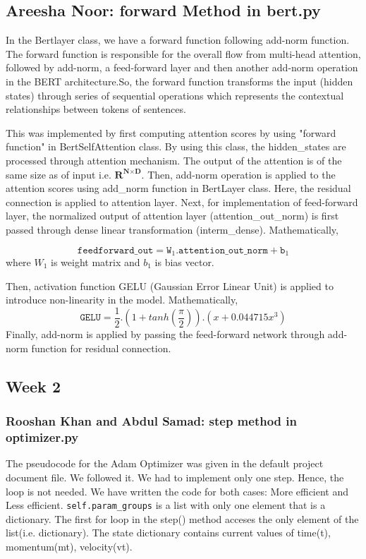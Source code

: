 \documentclass{article}
\begin{document}
\subsection{Areesha Noor: forward Method in bert.py}
In the Bertlayer class, we have a forward function following add-norm function. The forward function is responsible for the overall flow from multi-head attention, followed by add-norm, a  feed-forward layer and then another add-norm operation in the BERT architecture.So, the forward function transforms the input (hidden states) through series of sequential operations which represents the contextual relationships between tokens of sentences.

This was implemented by first computing attention scores by using "forward function" in  BertSelfAttention class. By using this class, the hidden\_states are processed through attention mechanism. The output of the attention is of the same size as of input i.e.  $\textbf{R}^{\textbf{N} \times \textbf{D}}$. Then, add-norm operation is applied to the attention scores using add\_norm function in BertLayer class. Here, the residual connection is applied to attention layer. Next, for implementation of feed-forward layer, the normalized output of attention layer (attention\_out\_norm) is first passed through dense linear transformation (interm\_dense). Mathematically, 

\begin{equation} \label{eqn5}
\texttt{feedforward\_out}=\texttt{W}_1.\texttt{attention\_out\_norm}+\texttt{b}_1
\end{equation}
where 
$W_1$ is weight matrix and $b_1$ is bias vector. 

Then, activation function GELU (Gaussian Error Linear Unit) is applied to introduce non-linearity in the model. Mathematically,
\begin{equation} \label{eqn6}
\texttt{GELU}=\frac{1}{2}.(1+tanh(\frac{\pi}{2})).(x+0.044715x^3)
\end{equation}
Finally, add-norm is applied by passing the feed-forward network through add-norm function for residual connection.
\subsection{Week 2}
\subsubsection{Rooshan Khan and Abdul Samad: step method in optimizer.py}
The pseudocode for the Adam Optimizer was given in the default project document file. We followed it. We had to implement only one step. Hence, the loop is not needed. We have written the code for both cases: More efficient and Less efficient. \texttt{self.param\_groups} is a list with only one element that is a dictionary. The first for loop in the step() method acceses the only element of the list(i.e. dictionary). The state dictionary contains current values of time(t), momentum(mt), velocity(vt).
\end{document}
